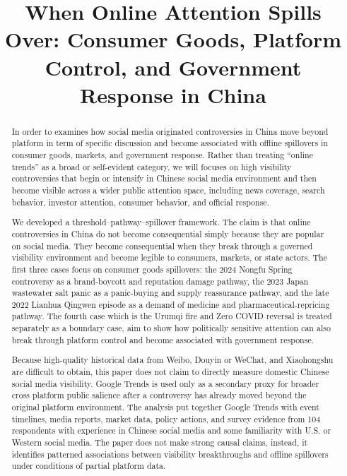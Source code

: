 \documentclass[conference]{IEEEtran}
\title{When Online Attention Spills Over: Consumer Goods, Platform Control, and Government Response in China}
\author{
\IEEEauthorblockN{Hanyu Xie}
\IEEEauthorblockA{
Columbia University \\
 hx2413@columbia.edu
}
\and
\IEEEauthorblockN{Haotian Lei}
\IEEEauthorblockA{
Columbia University \\
 hl3945@columbia.edu
}
}
\begin{document}
\maketitle

\begin{abstract}
In order to examines how social media originated controversies in China move beyond platform in term of specific discussion and become associated with offline spillovers in consumer goods, markets, and government response. Rather than treating ``online trends'' as a broad or self-evident category, we will focuses on high visibility controversies that begin or intensify in Chinese social media environment and then become visible across a wider public attention space, including news coverage, search behavior, investor attention, consumer behavior, and official response.

We developed a threshold--pathway--spillover framework. The claim is that online controversies in China do not become consequential simply because they are popular on social media. They become consequential when they break through a governed visibility environment and become legible to consumers, markets, or state actors. The first three cases focus on consumer goods spillovers: the 2024 Nongfu Spring controversy as a brand-boycott and reputation damage pathway, the 2023 Japan wastewater salt panic as a panic-buying and supply reassurance pathway, and the late 2022 Lianhua Qingwen episode as a demand of medicine and pharmaceutical-repricing pathway. The fourth case which is the Urumqi fire and Zero COVID reversal is treated separately as a boundary case, aim to show how politically sensitive attention can also break through platform control and become associated with government response.

Because high-quality historical data from Weibo, Douyin or WeChat, and Xiaohongshu are difficult to obtain, this paper does not claim to directly measure domestic Chinese social media visibility. Google Trends is used only as a secondary proxy for broader cross platform public salience after a controversy has already moved beyond the original platform environment. The analysis put together Google Trends with event timelines, media reports, market data, policy actions, and survey evidence from 104 respondents with experience in Chinese social media and some familiarity with U.S. or Western social media. The paper does not make strong causal claims, instead, it identifies patterned associations between visibility breakthroughs and offline spillovers under conditions of partial platform data.
\end{abstract}
\end{document}
